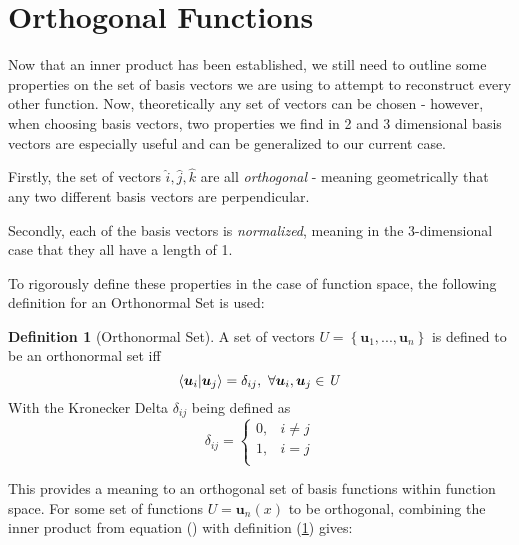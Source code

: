 \documentclass{article}
\newcommand{\B}[1]{\boldsymbol{#1}}
\theoremstyle{definition}
\newtheorem{definition}{Definition}[section]
\theoremstyle{remark}
\begin{document}

\section{Orthogonal Functions}

Now that an inner product has been established, we still need to 
outline some properties on the set of basis vectors we are using
to attempt to reconstruct every other function. Now, theoretically 
any set of vectors can be chosen - however, when choosing 
basis vectors, two properties we find in 2 and 3 dimensional 
basis vectors are especially useful and can be generalized 
to our current case.

Firstly, the set of vectors $\hat{i}, \hat{j}, \hat{k}$ are all \textit{orthogonal} - 
meaning geometrically that any two different basis vectors are perpendicular.

Secondly, each of the basis vectors is \textit{normalized}, meaning 
in the 3-dimensional case that they all have a length of 1.

To rigorously define these properties in the case of function space,
the following definition for an Orthonormal Set is used:


\begin{definition}[Orthonormal Set]
  A set of vectors $\mathit{U} = \left\{ \B{u}_1, ... , \B{u}_n \right\}$ is defined
  to be an orthonormal set iff
  \begin{equation}
    \braket{\B{u}_i| \B{u}_j} = \delta_{ij}, ~ \forall \B{u}_i, \B{u}_j \in  \mathit{U}
  \end{equation}
  With the Kronecker Delta $\delta_{ij}$ being defined as 
  \begin{equation}
    \delta_{ij} = 
    \begin{cases}
      0,  & i \neq j \\
      1, & i = j \\
    \end{cases}
  \end{equation}
  \label{def:OrthagonalSet}
\end{definition}

This provides a meaning to an orthogonal set of basis functions within function space.
For some set of functions $\mathit{U} = {\B{u}_n(x)}$ to be orthogonal,
combining the inner product from equation () with definition (\ref{def:OrthagonalSet})
gives:
\end{document}
